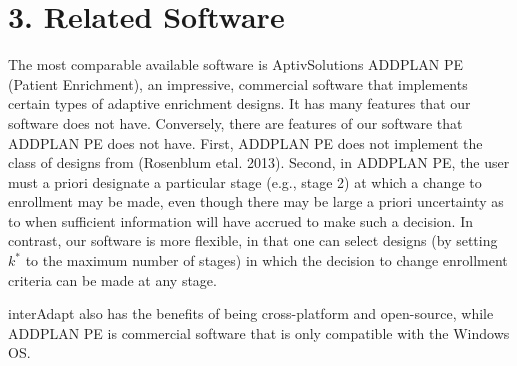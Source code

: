\documentclass{article}
\newcommand{\interAdapt}{\textsf{interAdapt }}
\begin{document}



\section*{3. Related Software}

The most comparable available software is AptivSolutions ADDPLAN PE (Patient Enrichment), an impressive, commercial software that implements certain types of adaptive enrichment designs. It has many features that our software does not have. Conversely, there are features of our software that ADDPLAN PE does not have. First, ADDPLAN PE does not implement the class of designs from (Rosenblum etal. 2013)\cite{Rosenblum2013AdaptMISTIE}. Second, in ADDPLAN PE, the user must a priori designate a particular stage (e.g., stage 2) at which a change to enrollment may be made, even though there may be large a priori uncertainty as to when sufficient information will have accrued to make such a decision. In contrast, our software is more flexible, in that one can select designs (by setting $k^*$ to the maximum number of stages) in which the decision to change enrollment criteria can be made at any stage.  

\interAdapt also has the benefits of being cross-platform and open-source, while ADDPLAN PE is commercial software that is only compatible with the Windows OS.
\end{document}
